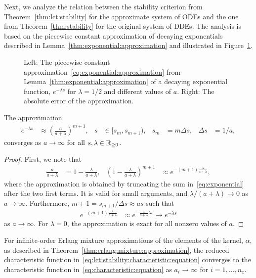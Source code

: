 Next, we analyze the relation between the stability criterion from Theorem~\ref{thm:lct:stability} for the approximate system of ODEs and the one from Theorem~\ref{thm:stability} for the original system of DDEs. The analysis is based on the piecewise constant approximation of decaying exponentials described in Lemma~\ref{thm:exponential:approximation} and illustrated in Figure~\ref{fig:exponential:approximation}.
%
\begin{figure}
	\centering
	\caption{Left: The piecewise constant approximation~\eqref{eq:exponential:approximation} from Lemma~\ref{thm:exponential:approximation} of a decaying exponential function, $e^{-\lambda s}$ for $\lambda = 1/2$ and different values of $a$. Right: The absolute error of the approximation.}
	\label{fig:exponential:approximation}
\end{figure}
%
\begin{lemma}\label{thm:exponential:approximation}
	The approximation
	\begin{align}\label{eq:exponential:approximation}
		e^{-\lambda s} &\approx \left(\frac{a}{a + \lambda}\right)^{m+1}, &
		s &\in [s_m, s_{m+1}), & s_m &= m \Delta s, & \Delta s &= 1/a,
	\end{align}
	converges as $a \rightarrow \infty$ for all $s, \lambda \in \mathbb{R}_{\geq 0}$.
\end{lemma}
%
\begin{proof}
	First, we note that
	\begin{align}
		\frac{a}{a + \lambda} &= 1 - \frac{\lambda}{a + \lambda}, &
		\left(1 - \frac{\lambda}{a + \lambda}\right)^{m+1} &\approx e^{-(m+1) \frac{\lambda}{a + \lambda}},
	\end{align}
	where the approximation is obtained by truncating the sum in~\eqref{eq:exponential} after the two first terms. It is valid for small arguments, and $\lambda/(a + \lambda) \rightarrow 0$ as $a\rightarrow \infty$. Furthermore, $m+1 = s_{m+1}/\Delta s \approx as$ such that
	\begin{align}
		e^{-(m+1) \frac{\lambda}{a + \lambda}} &\approx e^{-\frac{a}{a + \lambda} \lambda s} \rightarrow e^{-\lambda s}
	\end{align}
	as $a \rightarrow \infty$. For $\lambda = 0$, the approximation is exact for all nonzero values of $a$.
\end{proof}
%
\begin{theorem}
	For infinite-order Erlang mixture approximations of the elements of the kernel, $\alpha$, as described in Theorem~\ref{thm:erlang:mixture:approximation}, the reduced characteristic function in~\eqref{eq:lct:stability:characteristic:equation} converges to the characteristic function in~\eqref{eq:characteristic:equation} as $a_i \rightarrow \infty$ for $i = 1, \ldots, n_z$.
\end{theorem}
